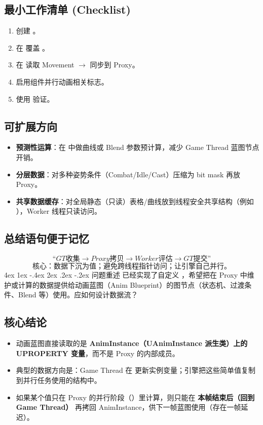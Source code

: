 \documentclass[10pt,openright,oneside,CJKmath]{MyBook}
\makeatletter
\renewcommand{\section}{\@startsection{section}{1}{\z@}%
{4ex \@plus 1ex \@minus -.4ex}%
{2ex \@plus.2ex \@minus -.2ex}%
{\color{black}\rmfamily\large\sffamily\bfseries}}
\makeatother
\begin{document}
\subsection{最小工作清单 (Checklist)}
\begin{enumerate}
  \item 创建 。
  \item 在  覆盖 。
  \item 在  读取 Movement $\rightarrow$ 同步到 Proxy。
  \item 启用组件并行动画相关标志。
  \item 使用  验证。
\end{enumerate}

\subsection{可扩展方向}
\begin{itemize}
  \item \textbf{预测性运算}：在  中做曲线或 Blend 参数预计算，减少 Game Thread 蓝图节点开销。
  \item \textbf{分层数据}：对多种姿势条件（Combat/Idle/Cast）压缩为 bit mask 再放 Proxy。
  \item \textbf{共享数据缓存}：对全局静态（只读）表格/曲线放到线程安全共享结构（例如 ），Worker 线程只读访问。
\end{itemize}

\subsection{总结语句便于记忆}
\[
{“GT 收集  \rightarrow Proxy 拷贝  \rightarrow Worker 评估  \rightarrow GT 提交”}
\]
\[
{核心：数据下沉为值；避免跨线程指针访问；让引擎自己并行。}
\]
\section{问题重述}
已经实现了自定义 ，希望把在 Proxy 中维护或计算的数据提供给动画蓝图（Anim Blueprint）的图节点（状态机、过渡条件、Blend 等）使用。应如何设计数据流？

\subsection{核心结论}
\begin{itemize}
  \item 动画蓝图直接读取的是 \textbf{AnimInstance（UAnimInstance 派生类）上的 UPROPERTY 变量}，而不是 Proxy 的内部成员。
  \item 典型的数据方向是：Game Thread 在  更新实例变量；引擎把这些简单值复制到并行任务使用的结构中。
  \item 如果某个值只在 Proxy 的并行阶段（）里计算，则只能在 \textbf{本帧结束后（回到 Game Thread）} 再拷回 AnimInstance，供下一帧蓝图使用（存在一帧延迟）。
\end{itemize}
\end{document}
